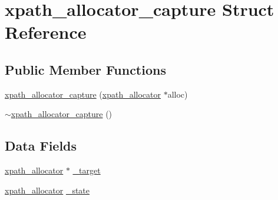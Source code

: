 \hypertarget{structxpath__allocator__capture}{
\section{xpath\_\-allocator\_\-capture Struct Reference}
\label{structxpath__allocator__capture}
}
\subsection*{Public Member Functions}
\begin{DoxyCompactItemize}
\item 
\hyperlink{structxpath__allocator__capture_af6925e08c811c0cbda74d4da5b9f2eed}{xpath\_\-allocator\_\-capture} (\hyperlink{classxpath__allocator}{xpath\_\-allocator} $\ast$alloc)
\item 
\hyperlink{structxpath__allocator__capture_a09d4f62de6a543483b94eec405667101}{$\sim$xpath\_\-allocator\_\-capture} ()
\end{DoxyCompactItemize}
\subsection*{Data Fields}
\begin{DoxyCompactItemize}
\item 
\hyperlink{classxpath__allocator}{xpath\_\-allocator} $\ast$ \hyperlink{structxpath__allocator__capture_a382acca931c691699ec84a03fb060cf4}{\_\-target}
\item 
\hyperlink{classxpath__allocator}{xpath\_\-allocator} \hyperlink{structxpath__allocator__capture_a275859dc99681c12b42ee4f51b713d39}{\_\-state}
\end{DoxyCompactItemize}


